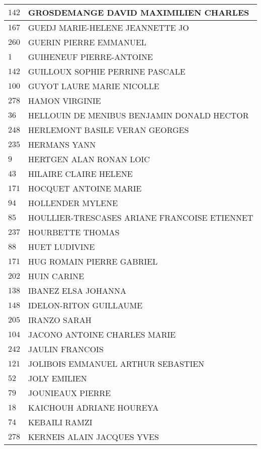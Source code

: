 \begin{xltabular}{\linewidth}{|l|X|}
    \hline
    $142$ & GROSDEMANGE DAVID MAXIMILIEN CHARLES \\
    \hline
    $167$ & GUEDJ MARIE-HELENE JEANNETTE JO \\
    \hline
    $260$ & GUERIN PIERRE EMMANUEL \\
    \hline
    $1$ & GUIHENEUF PIERRE-ANTOINE \\
    \hline
    $142$ & GUILLOUX SOPHIE PERRINE PASCALE \\
    \hline
    $100$ & GUYOT LAURE MARIE NICOLLE \\
    \hline
    $278$ & HAMON VIRGINIE \\
    \hline
    $36$ & HELLOUIN DE MENIBUS BENJAMIN DONALD HECTOR \\
    \hline
    $248$ & HERLEMONT BASILE VERAN GEORGES \\
    \hline
    $235$ & HERMANS YANN \\
    \hline
    $9$ & HERTGEN ALAN RONAN LOIC \\
    \hline
    $43$ & HILAIRE CLAIRE HELENE \\
    \hline
    $171$ & HOCQUET ANTOINE MARIE \\
    \hline
    $94$ & HOLLENDER MYLENE \\
    \hline
    $85$ & HOULLIER-TRESCASES ARIANE FRANCOISE ETIENNET \\
    \hline
    $237$ & HOURBETTE THOMAS \\
    \hline
    $88$ & HUET LUDIVINE \\
    \hline
    $171$ & HUG ROMAIN PIERRE GABRIEL \\
    \hline
    $202$ & HUIN CARINE \\
    \hline
    $138$ & IBANEZ ELSA JOHANNA \\
    \hline
    $148$ & IDELON-RITON GUILLAUME \\
    \hline
    $205$ & IRANZO SARAH \\
    \hline
    $104$ & JACONO ANTOINE CHARLES MARIE \\
    \hline
    $242$ & JAULIN FRANCOIS \\
    \hline
    $121$ & JOLIBOIS EMMANUEL ARTHUR SEBASTIEN \\
    \hline
    $52$ & JOLY EMILIEN \\
    \hline
    $79$ & JOUNIEAUX PIERRE \\
    \hline
    $18$ & KAICHOUH ADRIANE HOUREYA \\
    \hline
    $74$ & KEBAILI RAMZI \\
    \hline
    $278$ & KERNEIS ALAIN JACQUES YVES \\

\end{xltabular}
